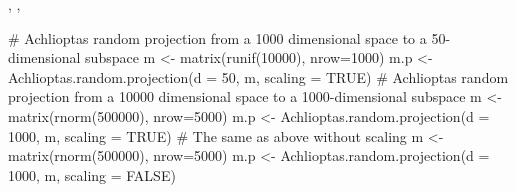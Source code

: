 \documentclass{article}
\begin{document}
\begin{SeeAlso}\relax
{}, ,
\end{SeeAlso}
\begin{Examples}
\begin{ExampleCode}
# Achlioptas random projection from a 1000 dimensional space to a 50-dimensional subspace
m <- matrix(runif(10000), nrow=1000)
m.p <- Achlioptas.random.projection(d = 50, m, scaling = TRUE)
# Achlioptas random projection from a 10000 dimensional space to a 1000-dimensional subspace
m <- matrix(rnorm(500000), nrow=5000)
m.p <- Achlioptas.random.projection(d = 1000, m, scaling = TRUE)
# The same as above without scaling
m <- matrix(rnorm(500000), nrow=5000)
m.p <- Achlioptas.random.projection(d = 1000, m, scaling = FALSE)
\end{ExampleCode}
\end{Examples}
\end{document}
